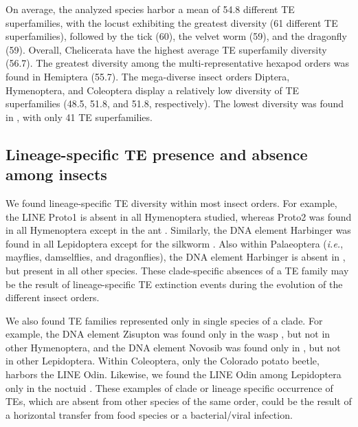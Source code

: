 On average, the analyzed species harbor a mean of 54.8 different TE
superfamilies, with the locust  exhibiting the
greatest diversity (61 different TE superfamilies), followed by the tick
 (60), the velvet worm
 (59), and the dragonfly  (59). Overall, Chelicerata have the highest average TE
superfamily diversity (56.7).  The greatest diversity among the
multi-representative hexapod orders was found in Hemiptera (55.7). The
mega-diverse insect orders Diptera, Hymenoptera, and Coleoptera display
a relatively low diversity of TE superfamilies (48.5, 51.8, and 51.8,
respectively). The lowest diversity was found in ,
with only 41 TE superfamilies.

\subsection{Lineage-specific TE presence and absence among
insects}\label{lineage-specific-te-presence-and-absence-among-insects}

We found lineage-specific TE diversity within most insect orders. For
example, the LINE Proto1 is absent in all Hymenoptera studied, whereas
Proto2 was found in all Hymenoptera except in the ant . Similarly, the DNA element Harbinger was found in all
Lepidoptera except for the silkworm . Also within
Palaeoptera (\emph{i.e.}, mayflies, damselflies, and dragonflies), the
DNA element Harbinger is absent in , but present in
all other species. These clade-specific absences of a TE family may be
the result of lineage-specific TE extinction events during the evolution
of the different insect orders.

We also found TE families represented only in single species of a clade.
For example, the DNA element Zisupton was found only in the wasp
, but not in other Hymenoptera, and the
DNA element Novosib was found only in , but not in
other Lepidoptera. Within Coleoptera, only the Colorado potato beetle,
 harbors the LINE Odin. Likewise, we
found the LINE Odin among Lepidoptera only in the noctuid
. These examples of clade or lineage
specific occurrence of TEs, which are absent from other species of the
same order, could be the result of a horizontal transfer from food
species or a bacterial/viral infection.



